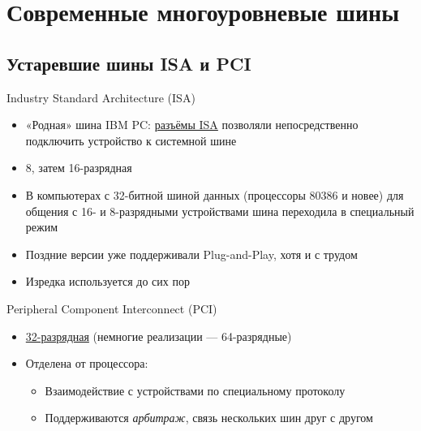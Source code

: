 \documentclass[xetex,aspectratio=43]{beamer}
\begin{document}
\section{Современные многоуровневые шины}

\subsection{Устаревшие шины ISA и PCI}

\begin{frame}{Industry Standard Architecture (ISA)}
    \begin{itemize}
        \item «Родная» шина IBM PC: \href{https://en.wikipedia.org/wiki/Industry_Standard_Architecture}{разъёмы ISA} позволяли непосредственно подключить устройство к системной шине
        \item 8, затем 16-разрядная
        \item В компьютерах с 32-битной шиной данных (процессоры 80386 и новее) для общения с 16- и 8-разрядными устройствами шина переходила в специальный режим
        \item Поздние версии уже поддерживали Plug-and-Play, хотя и с трудом
        \pause
        \item Изредка используется до сих пор
    \end{itemize}
\end{frame}


\begin{frame}{Peripheral Component Interconnect (PCI)}
    \begin{itemize}
        \item \href{https://en.wikipedia.org/wiki/Peripheral_Component_Interconnect}{32-разрядная} (немногие реализации --- 64-разрядные)
        \item \alert<2->{Отделена от процессора:}
        \begin{itemize}
            \item Взаимодействие с устройствами по специальному протоколу
            \item Поддерживаются \emph{арбитраж}, связь нескольких шин друг с другом
        \end{itemize}
    \end{itemize}
\end{frame}
\end{document}
